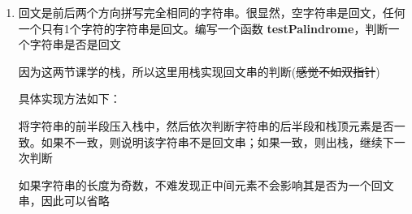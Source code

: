 \begin{enumerate}
\begin{choices}
\begin{mquote}
                    \end{mquote}
                    
            \end{choices}
        \item 回文是前后两个方向拼写完全相同的字符串。很显然，空字符串是回文，任何一个只有1个字符的字符串是回文。编写一个函数 \textbf{testPalindrome}，判断一个字符串是否是回文
            \begin{mquote}
                \par 因为这两节课学的栈，所以这里用栈实现回文串的判断(\sout{感觉不如双指针})
                \par 具体实现方法如下：
                \par 将字符串的前半段压入栈中，然后依次判断字符串的后半段和栈顶元素是否一致。如果不一致，则说明该字符串不是回文串；如果一致，则出栈，继续下一次判断
                \par 如果字符串的长度为奇数，不难发现正中间元素不会影响其是否为一个回文串，因此可以省略
            \end{mquote}
            
    \end{enumerate}